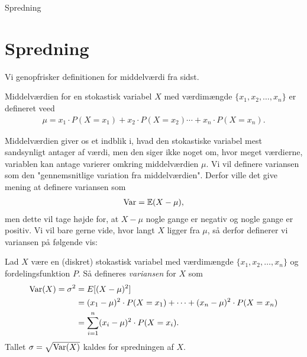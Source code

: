 \begin{center}
\Huge
Spredning
\end{center}
\section*{Spredning}

Vi genopfrisker definitionen for middelværdi fra sidst.
\begin{defn}[Middelværdi]
	Middelværdien for en stokastisk variabel $X$ med værdimængde $\{x_1,x_2,\hdots, x_n\}$ er 
	defineret veed
	\begin{align*}
		\mu = x_1\cdot P(X = x_1) + x_2 \cdot P(X = x_2) \cdots + x_n \cdot P(X = x_n).
	\end{align*}
\end{defn}
Middelværdien giver os et indblik i, hvad den stokastiske variabel mest sandsynligt antager af værdi, men den siger ikke noget om, hvor meget værdierne, variablen kan antage varierer omkring middelværdien $\mu$. Vi vil definere variansen som den "gennemsnitlige variation fra middelværdien". Derfor ville det give mening at definere variansen som 
\begin{align*}
\textnormal{Var} = \mathbb{E}(X-\mu), 
\end{align*}
men dette vil tage højde for, at $X-\mu$ nogle gange er negativ og nogle gange er positiv. Vi vil bare gerne vide, hvor langt $X$ ligger fra $\mu$, så derfor definerer vi variansen på følgende vis:
\begin{defn}
Lad $X$ være en (diskret) stokastisk variabel med værdimængde $\{x_1,x_2,\hdots,x_n\}$ og fordelingsfunktion $P$. Så defineres \textit{variansen} for $X$ som
\begin{align*}
\textnormal{Var}(X) = \sigma^2 &= E[(X-\mu)^2]\\
&= (x_1-\mu)^2\cdot P(X=x_1) + \cdots + (x_n-\mu)^2 \cdot P(X=x_n)\\
&= \sum_{i=1}^n (x_i-\mu)^2\cdot P(X=x_i).
\end{align*}
Tallet $\sigma = \sqrt{\textnormal{Var}(X)}$ kaldes for spredningen af $X$. 
\end{defn}


